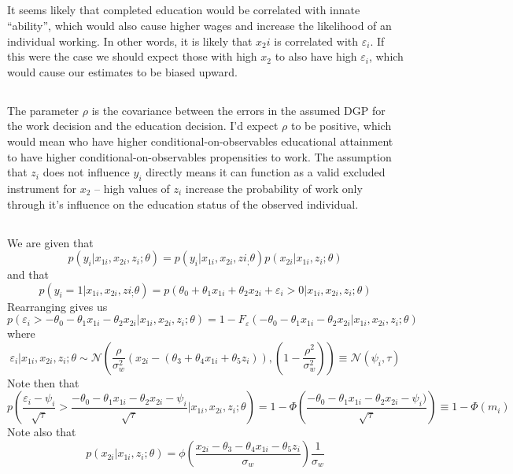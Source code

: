 \documentclass[11pt]{article}
\begin{document}
\subsection{}
It seems likely that completed education would be correlated with innate ``ability'', which would also cause higher wages and increase the likelihood of an individual working. In other words, it is likely that $x_2i$ is correlated with $\varepsilon_i$. If this were the case we should expect those with high $x_2$ to also have high $\varepsilon_i$, which would cause our estimates to be biased upward.
\subsection{}
The parameter $\rho$ is the covariance between the errors in the assumed DGP for the work decision and the education decision. I'd expect $\rho$ to be positive, which would mean who have higher conditional-on-observables educational attainment to have higher conditional-on-observables propensities to work. The assumption that $z_i$ does not influence $y_i$ directly means it can function as a valid excluded instrument for $x_2$ -- high values of $z_i$ increase the probability of work only through it's influence on the education status of the observed individual.
\subsection{}
We are given that $$p(y_i | x_{1i}, x_{2i}, z_i; \theta) = p(y_i | x_{1i}, x_{2i}, zi_; \theta)p(x_{2i} | x_{1i}, z_i; \theta)$$ and that $$p(y_i = 1 | x_{1i}, x_{2i}, zi_; \theta) = p(\theta_0 + \theta_1 x_{1i} + \theta_2 x_{2i} + \varepsilon_i > 0 | x_{1i}, x_{2i}, z_{i}; \theta)$$ 
Rearranging gives us 
$$p(\varepsilon_i > - \theta_0 - \theta_1 x_{1i} - \theta_2 x_{2i} | x_{1i}, x_{2i}, z_{i}; \theta)  = 1 - F_{\varepsilon}(- \theta_0 - \theta_1 x_{1i} - \theta_2 x_{2i} | x_{1i}, x_{2i}, z_{i}; \theta)$$ 
where $$\varepsilon_i | x_{1i}, x_{2i}, z_{i} ; \theta \sim \mathcal{N}(\frac{\rho}{\sigma_{w}^2}(x_{2i} - (\theta_3 + \theta_4 x_{1i} + \theta_5z_i)), (1- \frac{\rho^2}{\sigma_w^2})) \equiv \mathcal{N}(\psi_i, \tau)$$
Note then that 
$$p(\frac{\varepsilon_i - \psi_i}{\sqrt{\tau}} > \frac{- \theta_0 - \theta_1 x_{1i} - \theta_2 x_{2i} -  \psi_i}{\sqrt{\tau}}| x_{1i}, x_{2i}, z_{i}; \theta) = 1-\Phi(\frac{-\theta_0 - \theta_1 x_{1i} - \theta_2 x_{2i} -  \psi_i)}{\sqrt{\tau}}) \equiv 1 - \Phi(m_i)$$
Note also that $$p(x_{2i} | x_{1i}, z_i; \theta) = \phi(\frac{x_{2i} - \theta_3  - \theta_4 x_{1i} - \theta_5z_i}{\sigma_w})\frac{1}{\sigma_w}$$
\end{document}
